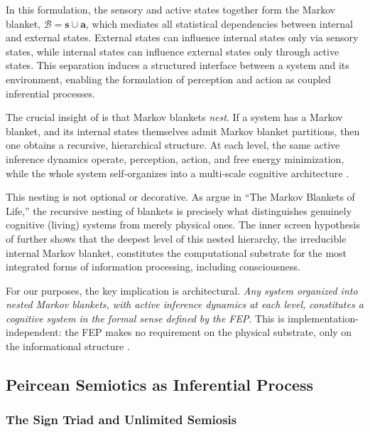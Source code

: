 \documentclass[11pt,a4paper]{article}
\theoremstyle{definition}
\newcommand{\bs}{\bm{s}}
\newcommand{\ba}{\bm{a}}
\begin{document}
In this formulation, the sensory and active states together form the Markov blanket, $\mathcal{B} = \bs \cup \ba$, which mediates all statistical dependencies between internal and external states. External states can influence internal states only via sensory states, while internal states can influence external states only through active states. This separation induces a structured interface between a system and its environment, enabling the formulation of perception and action as coupled inferential processes.

The crucial insight of \citet{friston2019particular} is that Markov blankets \emph{nest}. If a system has a Markov blanket, and its internal states themselves admit Markov blanket partitions, then one obtains a recursive, hierarchical structure. At each level, the same active inference dynamics operate, perception, action, and free energy minimization, while the whole system self-organizes into a multi-scale cognitive architecture \citep{kirchhoff2018markov, ramstead2023inner}.

This nesting is not optional or decorative. As \citet{kirchhoff2018markov} argue in ``The Markov Blankets of Life,'' the recursive nesting of blankets is precisely what distinguishes genuinely cognitive (living) systems from merely physical ones. The inner screen hypothesis of \citet{ramstead2023inner} further shows that the deepest level of this nested hierarchy, the irreducible internal Markov blanket, constitutes the computational substrate for the most integrated forms of information processing, including consciousness.

For our purposes, the key implication is architectural. \emph{Any system organized into nested Markov blankets, with active inference dynamics at each level, constitutes a cognitive system in the formal sense defined by the FEP}. This is implementation-independent: the FEP makes no requirement on the physical substrate, only on the informational structure \citep{fields2025inner}.


\subsection{Peircean Semiotics as Inferential Process}
\label{sec:peirce}

\subsubsection{The Sign Triad and Unlimited Semiosis}
\end{document}
